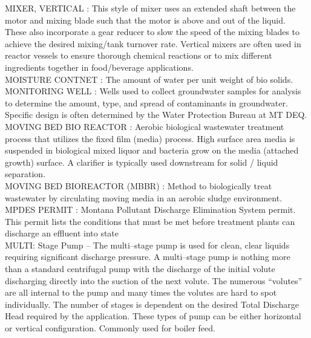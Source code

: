 \vspace{0.15cm}
MIXER, VERTICAL :   This style of mixer uses an extended shaft between the motor and mixing blade such that the motor is above and out of the liquid. These also incorporate a gear reducer to slow the speed of the mixing blades to achieve the desired mixing/tank turnover rate. Vertical mixers are often used in reactor vessels to ensure thorough chemical reactions or to mix different ingredients together in food/beverage applications.\\
\vspace{0.15cm}
MOISTURE CONTNET :  The amount of water per unit weight of bio solids. \\
\vspace{0.15cm}
MONITORING WELL :  Wells used to collect groundwater samples for analysis to determine the amount, type, and spread of contaminants in groundwater. Specific design is often determined by the Water Protection Bureau at MT DEQ.\\
\vspace{0.15cm}
MOVING BED BIO REACTOR :   Aerobic biological wastewater treatment process that utilizes the fixed film (media) process. High surface area media is suspended in biological mixed liquor and bacteria grow on the media (attached growth) surface. A clarifier is typically used downstream for solid / liquid separation.\\
\vspace{0.15cm}
MOVING BED BIOREACTOR (MBBR) :   Method to biologically treat wastewater by circulating moving media in an aerobic sludge environment.\\
\vspace{0.15cm}
MPDES PERMIT :  Montana Pollutant Discharge Elimination System permit. This permit lists the conditions that must be met before treatment plants can discharge an effluent into state\\
\vspace{0.15cm}
MULTI: Stage Pump –  The multi–stage pump is used for clean, clear liquids requiring significant discharge pressure. A multi–stage pump is nothing more than a standard centrifugal pump with the discharge of the initial volute discharging directly into the suction of the next volute. The numerous “volutes” are all internal to the pump and many times the volutes are hard to spot individually. The number of stages is dependent on the desired Total Discharge Head required by the application. These types of pump can be either horizontal or vertical configuration. Commonly used for boiler feed.\\
